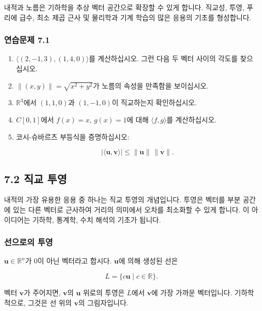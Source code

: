 \documentclass[
  12pt,
  a4paper,
]{article}
\begin{document}
내적과 노름은 기하학을 추상 벡터 공간으로 확장할 수 있게 합니다. 직교성, 투영, 푸리에 급수, 최소 제곱 근사 및 물리학과 기계 학습의 많은 응용의 기초를 형성합니다.

\subsubsection{연습문제 7.1}\label{exercises-71}

\begin{enumerate}
\def\labelenumi{\arabic{enumi}.}
\item
  \(\langle (2,-1,3), (1,4,0) \rangle\)를 계산하십시오. 그런 다음 두 벡터 사이의 각도를 찾으십시오.
\item
  \(\|(x,y)\| = \sqrt{x^2+y^2}\)가 노름의 속성을 만족함을 보이십시오.
\item
  \(\mathbb{R}^3\)에서 \((1,1,0)\)과 \((1,-1,0)\)이 직교하는지 확인하십시오.
\item
  \(C[0,1]\)에서 \(f(x)=x\), \(g(x)=1\)에 대해 \(\langle f,g \rangle\)를 계산하십시오.
\item
  코시-슈바르츠 부등식을 증명하십시오:

  \[|\langle \mathbf{u}, \mathbf{v} \rangle| \leq \|\mathbf{u}\| \, \|\mathbf{v}\|.\]
\end{enumerate}

\subsection{7.2 직교 투영}\label{72-orthogonal-projections}

내적의 가장 유용한 응용 중 하나는 직교 투영의 개념입니다. 투영은 벡터를 부분 공간에 있는 다른 벡터로 근사하여 거리의 의미에서 오차를 최소화할 수 있게 합니다. 이 아이디어는 기하학, 통계학, 수치 해석의 기초가 됩니다.

\subsubsection{선으로의 투영}\label{projection-onto-a-line}

\(\mathbf{u} \in \mathbb{R}^n\)가 0이 아닌 벡터라고 합시다. \(\mathbf{u}\)에 의해 생성된 선은

\[L = \{ c\mathbf{u} \mid c \in \mathbb{R} \}.\]

벡터 \(\mathbf{v}\)가 주어지면, \(\mathbf{v}\)의 \(\mathbf{u}\) 위로의 투영은 \(L\)에서 \(\mathbf{v}\)에 가장 가까운 벡터입니다. 기하학적으로, 그것은 선 위의 \(\mathbf{v}\)의 그림자입니다.
\end{document}
